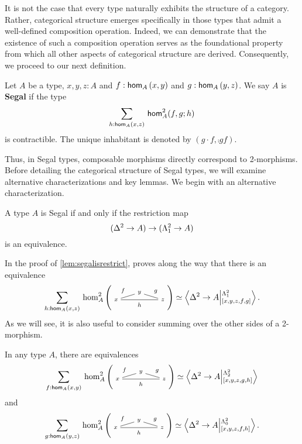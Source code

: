 \documentclass[main.tex]{subfiles}
\begin{document}
It is not the case that every type naturally exhibits the structure of a category. Rather, categorical structure emerges specifically in those types that admit a well-defined composition operation. Indeed, we can demonstrate that the existence of such a composition operation serves as the foundational property from which all other aspects of categorical structure are derived. Consequently, we proceed to our next definition.
\begin{definition}
    \label{def:def3.3}
    Let $A$ be a type, $x,y,z : A$ and $f : \ho[A]{x}{y}$ and $g : \ho[A]{y}{z}$. We say $A$ is \textbf{Segal} if the type $${\sm{h : \ho[A]{x}{z}} \hot[A]{f}{g}{h}} $$
    is contractible. The unique inhabitant is denoted by $(g\cdot f, \comp{g}{f}).$
\end{definition}

Thus, in Segal types, composable morphisms directly correspond to 2-mor{\linebreak}phisms. Before detailing the categorical structure of Segal types, we will examine alternative characterizations and key lemmas. We begin with an alternative characterization.

\begin{lemma}
    \label{lem:segalisrestrict}
    A type $A$ is Segal if and only if the restriction map
    $$
    (\tsx \to A) \to (\tohorn \to A) 
    $$
    is an equivalence. 
    \end{lemma}
    In the proof of \ref{lem:segalisrestrict}, \cite{riehl_type_2017} proves along the way that there is an equivalence
    \begin{equation}
        \sm{h : \ho[A]{x}{z}}\homtwo{A}(x,y,z,f,g,h) \simeq \ndexten{\tsx}{A}{\tohorn}{[x,y,z,f,g]}.
    \end{equation}
    As we will see, it is also useful to consider summing over the other sides of a 2-morphism.
    \begin{corollary}
        In any type $A$, there are equivalences
        \begin{equation}
            \label{rem:sumoverfistt}
        \sm{f : \ho[A]{x}{y}}\homtwo{A}(x,y,z,f,g,h) \simeq \ndexten{\tsx}{A}{\tthorn}{[x,y,z,g,h]}
        \end{equation}
        and
        \begin{equation}
        \sm{g : \ho[A]{y}{z}}\homtwo{A}(x,y,z,f,g,h) \simeq \ndexten{\tsx}{A}{\tzhorn}{[x,y,z,f,h]}.
        \end{equation}
    \end{corollary}
\end{document}
